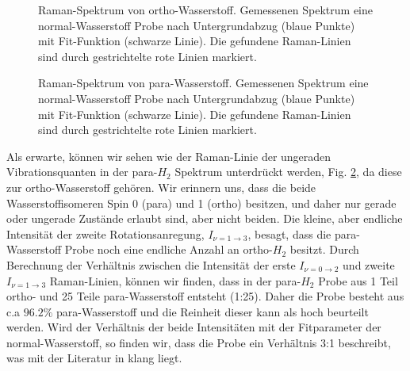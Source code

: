 \documentclass[11 pt]{article}
\begin{document}
\begin{figure}[htbp]
	\centering
   \caption{\small Raman-Spektrum von ortho-Wasserstoff. Gemessenen Spektrum eine normal-Wasserstoff Probe nach Untergrundabzug (blaue Punkte) mit Fit-Funktion (schwarze Linie). Die gefundene Raman-Linien sind durch gestrichtelte rote Linien markiert.}
   \label{fig:normal_H2}
\end{figure}

\begin{figure}[htbp]
	\centering
   \caption{\small Raman-Spektrum von para-Wasserstoff. Gemessenen Spektrum eine normal-Wasserstoff Probe nach Untergrundabzug (blaue Punkte) mit Fit-Funktion (schwarze Linie). Die gefundene Raman-Linien sind durch gestrichtelte rote Linien markiert.}
   \label{fig:para_H2}
\end{figure}

Als erwarte, können wir sehen wie der Raman-Linie der ungeraden Vibrationsquanten in der para-$H_2$ Spektrum unterdrückt werden, Fig. \ref{fig:para_H2}, da diese zur ortho-Wasserstoff gehören. Wir erinnern uns, dass die beide Wasserstoffisomeren Spin 0 (para) und 1 (ortho) besitzen, und daher nur gerade oder ungerade Zustände erlaubt sind, aber nicht beiden. Die kleine, aber endliche Intensität der zweite Rotationsanregung, $I_{\nu  = 1 \to 3}$, besagt, dass die para-Wasserstoff Probe noch eine endliche Anzahl an ortho-$H_2$ besitzt. Durch Berechnung der Verhältnis zwischen die Intensität der erste $I_{\nu  = 0 \to 2}$ und zweite $I_{\nu  = 1 \to 3}$ Raman-Linien, können wir finden, dass in der para-$H_2$ Probe aus 1 Teil ortho- und 25 Teile para-Wasserstoff entsteht (1:25). Daher die Probe besteht aus c.a $96.2\%$ para-Wasserstoff und die Reinheit dieser kann als hoch beurteilt werden. Wird der Verhältnis der beide Intensitäten mit der Fitparameter der normal-Wasserstoff, so finden wir, dass die Probe ein Verhältnis 3:1 beschreibt, was mit der Literatur in klang liegt.  
\end{document}
